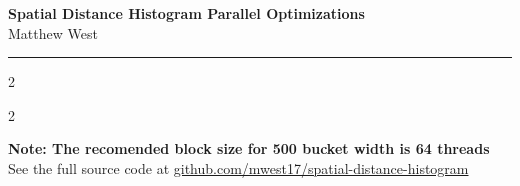 \documentclass[a4paper,12pt]{article}
\begin{document}
	\pagestyle{fancy}
	\thispagestyle{empty}
	\fancyhead[R]{}
	\fancyhead[L]{}
	\renewcommand*{\thefootnote}{\fnsymbol{footnote}}
	\begin{center}
		\Large{\textbf{Spatial Distance Histogram Parallel Optimizations}}
		\vspace{0.4cm}
		\normalsize
		\\ Matthew West
		\vspace{0.1cm}
		\medskip
		\normalsize
	\end{center}
	{\color{gray}\hrule}
	\vspace{0.4cm}
	\medskip
	\begin{multicols}{2}
	\end{multicols}
	
	\begin{multicols}{2}
	\end{multicols}
	 
 	\vspace{20pt}
 	
 	\noindent \textbf{Note: The recomended block size for 500 bucket width is 64 threads}\\
	\noindent See the full source code at \href{https://github.com/mwest17/spatial-distance-histogram}{github.com/mwest17/spatial-distance-histogram}


	
	
\end{document}
